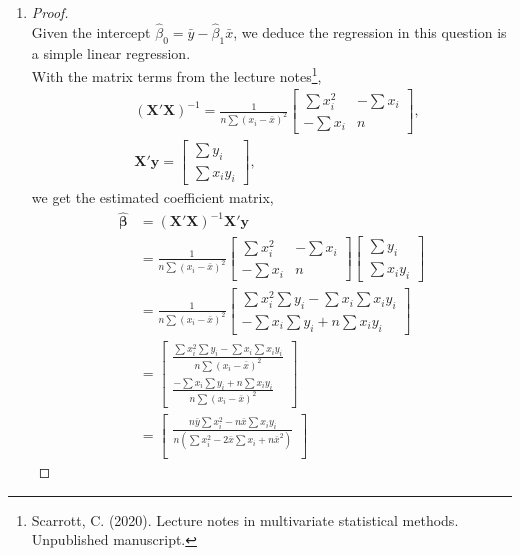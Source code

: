 \documentclass[10pt]{article}
\begin{document}
\begin{enumerate}[1)]
\item
\begin{proof}
\;\\
Given the intercept $\hat{\beta}_0=\bar{y}-\hat{\beta}_1\bar{x}$, we deduce the regression in this question is a simple linear regression.\\
With the matrix terms from the lecture notes\footnote{\;Scarrott, C. (2020). Lecture notes in multivariate statistical methods. Unpublished manuscript.},
\begin{align*}
&(\pmb{X}'\pmb{X})^{-1}=\frac{1}{n\sum(x_i-\bar{x})^2}
  \begin{bmatrix}
    \sum{x_i^2} & -\sum{x_i}\\
    -\sum{x_i} & n
  \end{bmatrix}
,\\
&\pmb{X}'\pmb{y}=
  \begin{bmatrix}
    \sum{y_i}\\
    \sum{x_i y_i}
  \end{bmatrix}
,
\end{align*}
we get the estimated coefficient matrix,
\begin{align*}
\pmb{\hat{\beta}}&=(\pmb{X}'\pmb{X})^{-1}\pmb{X}'\pmb{y}\\
&=\frac{1}{n\sum(x_i-\bar{x})^2}
  \begin{bmatrix}
    \sum{x_i^2} & -\sum{x_i}\\
    -\sum{x_i} & n
  \end{bmatrix}
  \begin{bmatrix}
    \sum{y_i}\\
    \sum{x_i y_i}
  \end{bmatrix}
\\
&=\frac{1}{n\sum(x_i-\bar{x})^2}
  \begin{bmatrix}
    \sum{x_i^2}\sum{y_i}-\sum{x_i}\sum{x_i y_i}\\
    -\sum{x_i}\sum{y_i}+n\sum{x_i y_i}
  \end{bmatrix}
\\
&=
  \begin{bmatrix}
    \frac{\sum{x_i^2}\sum{y_i}-\sum{x_i}\sum{x_i y_i}}{n\sum(x_i-\bar{x})^2}\\
    \frac{-\sum{x_i}\sum{y_i}+n\sum{x_i y_i}}{n\sum(x_i-\bar{x})^2}
  \end{bmatrix}
\\
&=
  \begin{bmatrix}
    \frac{n\bar{y}\sum{x_i^2}-n\bar{x}\sum{x_i y_i}}{n(\sum{x_i^2}-2\bar{x}\sum{x_i}+n\bar{x}^2)}\\

\end{bmatrix}
\end{align*}
\end{proof}
\end{enumerate}
\end{document}

